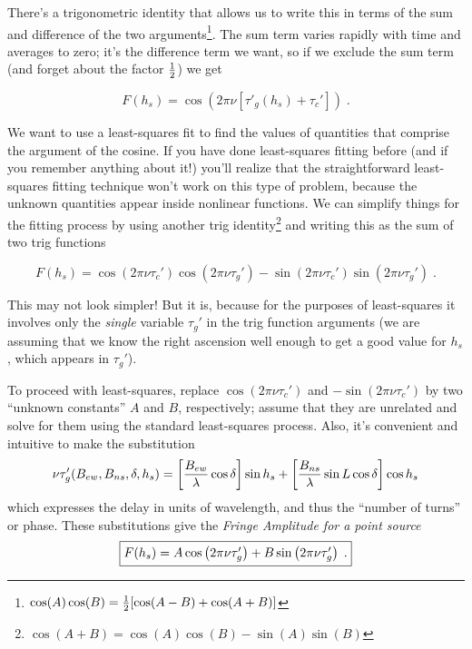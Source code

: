 \documentclass[11pt,preprint]{aastex}
\begin{document}
\noindent There's a trigonometric identity that allows us to write this
in terms of the sum and difference of the two
arguments\footnote{$\cos(A) \cos(B)= {1 \over 2}[\cos(A-B) +
\cos(A+B)]$}. The sum term varies rapidly with time and averages to zero;
it's the difference term we want, so if we exclude the sum term (and
forget about the factor $1 \over 2$) we get

\begin{equation}
 F(h_s) = \cos (2 \pi \nu [\tau'_{g}(h_s) + \tau_c']) \; . 
\end{equation}


	We want to use a least-squares fit to find the values of
quantities that comprise the argument of the cosine.  If you have done
least-squares fitting before (and if you remember anything about it!)
you'll realize that the straightforward least-squares fitting technique
won't work on this type of problem, because the unknown quantities
appear inside nonlinear functions.  We can simplify things for the
fitting process by using another trig identity\footnote{$\cos(A+B) =
\cos(A)\cos(B) - \sin(A)\sin(B)$} and writing this as the
sum of two trig functions

\begin{equation}
 F(h_s) = \cos(2 \pi \nu \tau_c') \cos \left(2 \pi \nu \tau_g' \right) - 
          \sin(2 \pi \nu \tau_c') \sin \left(2 \pi \nu \tau_g' \right) \; .  
\end{equation}

\noindent This may not look simpler! But it is, because for the purposes
of least-squares it involves only the {\it single} variable $\tau_g'$ in
the trig function arguments (we are assuming that we know the right
ascension well enough to get a good value for $h_s$, which appears in
$\tau_g'$).

	To proceed with least-squares, replace $\cos (2 \pi \nu \tau_c')$
and $-\sin (2 \pi \nu \tau_c')$ by two ``unknown constants'' $A$ and $B$,
respectively; assume that they are unrelated and solve for them using
the standard least-squares process. Also, it's convenient and intuitive
to make the substitution 
%
\begin{equation} \label{nutau}
\nu \tau_g'(B_{ew}, B_{ns}, \delta, h_s) = \left[{B_{ew} \over \lambda} \cos \delta \right] \sin h_s 
  + \left[{B_{ns} \over \lambda} \sin L \cos \delta \right] \cos h_s
\end{equation}
%
\noindent which expresses the delay in units of wavelength, and thus the
``number of turns'' or phase. These substitutions give the {\it Fringe
  Amplitude for a point source}
%
\begin{equation} \label{maineqn} \fbox{$
\label{fringeresponse}
 F(h_s) = A \cos \left(2 \pi \nu \tau_g' \right) 
         +B \sin \left(2 \pi \nu \tau_g' \right) \; . 
$}
\end{equation}
\end{document}
